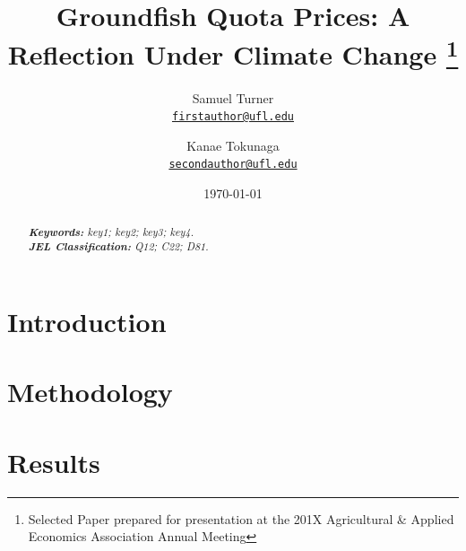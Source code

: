 \documentclass[11pt]{article}
\title{Groundfish Quota Prices: A Reflection Under Climate Change
\thanks{Selected Paper prepared for presentation at the 201X Agricultural \& Applied Economics Association Annual Meeting}
}
\author{Samuel Turner\\%
    \href{mailto:firstauthor@ufl.edu}{\texttt{firstauthor@ufl.edu}} %
\and Kanae Tokunaga\\%
    \href{mailto:secondauthor@ufl.edu}{\texttt{secondauthor@ufl.edu}} %
}
\date{\today}
\begin{document}
{
\maketitle
\begin{abstract}

\lipsum[1] %

\noindent
\textit{\textbf{Keywords: }%
key1; key2; key3; key4.} \\ %
\noindent
\textit{\textbf{JEL Classification: }%
Q12; C22; D81.} %

\end{abstract}
}


\section{Introduction}

\lipsum[2-5] %
\citet{Hardaker2004} %

\section{Methodology}

\lipsum[7-9] %
\citep{Chavas2015} %

\section{Results}

\lipsum[12-13] %
\end{document}
